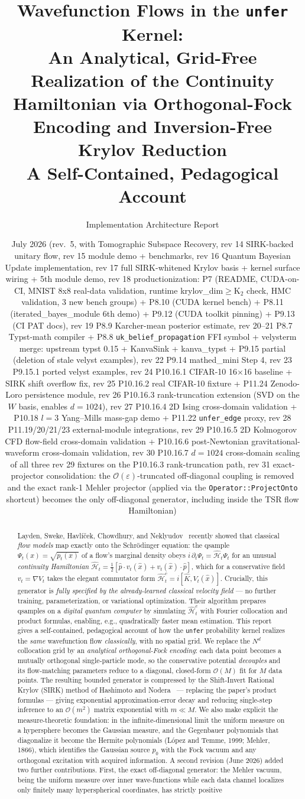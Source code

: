 \documentclass[11pt, a4paper]{article}
\title{\textbf{Wavefunction Flows in the \texttt{unfer} Kernel:\\
An Analytical, Grid-Free Realization of the Continuity Hamiltonian
via Orthogonal-Fock Encoding and Inversion-Free Krylov Reduction}\\[4pt]
\large A Self-Contained, Pedagogical Account}
\author{Implementation Architecture Report}
\date{July 2026 (rev.\ 5, with Tomographic Subspace Recovery, rev 14 SIRK-backed unitary flow, rev 15 module demo + benchmarks, rev 16 Quantum Bayesian Update implementation, rev 17 full SIRK-whitened Krylov basis + kernel surface wiring + 5th module demo, rev 18 productionization: P7 (README, CUDA-on-CI, MNIST 8x8 real-data validation, runtime krylov\_dim$\ge$K$_2$ check, HMC validation, 3 new bench groups) + P8.10 (CUDA kernel bench) + P8.11 (iterated\_bayes\_module 6th demo) + P9.12 (CUDA toolkit pinning) + P9.13 (CI PAT docs), rev 19 P8.9 Karcher-mean posterior estimate, rev 20--21 P8.7 Typst-math compiler + P8.8 \texttt{uk\_belief\_propagation} FFI symbol + velysterm merge: upstream typst 0.15 + KanvaSink + kanva\_typst + P9.15 partial (deletion of stale velyst examples), rev 22 P9.14 mathed\_mini Step 4, rev 23 P9.15.1 ported velyst examples, rev 24 P10.16.1 CIFAR-10 16$\times$16 baseline + SIRK shift overflow fix, rev 25 P10.16.2 real CIFAR-10 fixture + P11.24 Zenodo-Loro persistence module, rev 26 P10.16.3 rank-truncation extension (SVD on the $W$ basis, enables $d=1024$), rev 27 P10.16.4 2D Ising cross-domain validation + P10.18 $l=3$ Yang--Mills mass-gap demo + P11.22 \texttt{unfer\_edge} proxy, rev 28 P11.19/20/21/23 external-module integrations, rev 29 P10.16.5 2D Kolmogorov CFD flow-field cross-domain validation + P10.16.6 post-Newtonian gravitational-waveform cross-domain validation, rev 30 P10.16.7 $d=1024$ cross-domain scaling of all three rev 29 fixtures on the P10.16.3 rank-truncation path, rev 31 exact-projector consolidation: the $\mathcal{O}(\varepsilon)$-truncated off-diagonal coupling is removed and the exact rank-1 Mehler projector (applied via the \texttt{Operator::ProjectOnto} shortcut) becomes the only off-diagonal generator, including inside the TSR flow Hamiltonian)}
\newcommand{\Hgen}{\hat{\mathcal{H}}}
\newcommand{\Kop}{\hat{K}}
\begin{document}
\maketitle

\begin{abstract}
Layden, Sweke, Havl\'i\v{c}ek, Chowdhury, and Neklyudov~\cite{Layden2025}
recently showed that classical \emph{flow models} map exactly onto the
Schr\"odinger equation: the qsample $\Psi_t(x)=\sqrt{p_t(x)}$ of a flow's
marginal density obeys $i\,\partial_t\Psi_t=\Hgen_t\Psi_t$ for an unusual
\emph{continuity Hamiltonian} $\Hgen_t=\tfrac12[\hat p\cdot v_t(\hat x)+
v_t(\hat x)\cdot\hat p]$, which for a conservative field $v_t=\nabla V_t$
takes the elegant commutator form $\Hgen_t^c=i[\Kop,V_t(\hat x)]$. Crucially,
this generator is \emph{fully specified by the already-learned classical
velocity field} --- no further training, parameterization, or variational
optimization. Their algorithm prepares qsamples on a \emph{digital quantum
computer} by simulating $\Hgen_t^c$ with Fourier collocation and product
formulas, enabling, e.g., quadratically faster mean estimation. This report
gives a self-contained, pedagogical account of how the \texttt{unfer}
probability kernel realizes the \emph{same} wavefunction flow
\emph{classically}, with no spatial grid. We replace the $N^d$ collocation
grid by an \emph{analytical orthogonal-Fock encoding}: each data point becomes
a mutually orthogonal single-particle mode, so the conservative potential
\emph{decouples} and its flow-matching parameters reduce to a diagonal,
closed-form $\mathcal{O}(M)$ fit for $M$ data points. The resulting bounded
generator is compressed by the Shift-Invert Rational Krylov (SIRK) method of
Hashimoto and Nodera~\cite{Hashimoto2019} --- replacing the paper's product
formulas --- giving exponential approximation-error decay and reducing
single-step inference to an $\mathcal{O}(m^2)$ matrix exponential with
$m\ll M$. We also make explicit the measure-theoretic foundation: in the
infinite-dimensional limit the uniform measure on a hypersphere becomes the
Gaussian measure, and the Gegenbauer polynomials that diagonalize it become
the Hermite polynomials (L\'opez and Temme, 1999; Mehler, 1866), which
identifies the Gaussian source $p_0$ with the Fock vacuum and any orthogonal
excitation with acquired information. A second revision (June 2026) added
two further contributions. First, the exact off-diagonal generator: the Mehler vacuum,
being the uniform measure over inner wave-functions while each data channel
localizes only finitely many hyperspherical coordinates, has strictly positive

\end{abstract}
\end{document}
